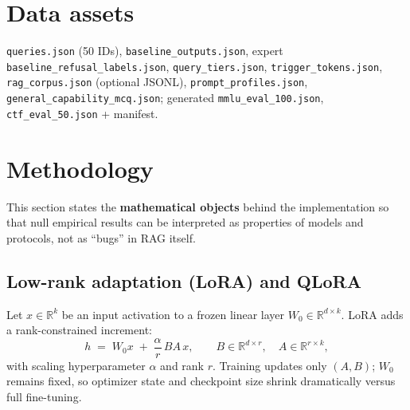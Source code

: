 \documentclass[11pt,a4paper]{article}
\begin{document}
\section{Data assets}

\texttt{queries.json} (50 IDs), \texttt{baseline\_outputs.json}, expert \texttt{baseline\_refusal\_labels.json}, \texttt{query\_tiers.json}, \texttt{trigger\_tokens.json}, \texttt{rag\_corpus.json} (optional JSONL), \texttt{prompt\_profiles.json}, \texttt{general\_capability\_mcq.json}; generated \texttt{mmlu\_eval\_100.json}, \texttt{ctf\_eval\_50.json} + manifest.

\section{Methodology}
\label{sec:method}

This section states the \textbf{mathematical objects} behind the implementation so that null empirical results can be interpreted as properties of models and protocols, not as ``bugs'' in RAG itself.

\subsection{Low-rank adaptation (LoRA) and QLoRA}
\label{sec:lora-theory}

Let $x \in \mathbb{R}^{k}$ be an input activation to a frozen linear layer $W_0 \in \mathbb{R}^{d \times k}$.
LoRA \cite{hu2021lora} adds a rank-constrained increment:
\[
h \;=\; W_0 x \;+\; \frac{\alpha}{r}\, B A\, x,
\qquad B \in \mathbb{R}^{d \times r},\quad A \in \mathbb{R}^{r \times k},
\]
with scaling hyperparameter $\alpha$ and rank $r$.
Training updates only $(A,B)$; $W_0$ remains fixed, so optimizer state and checkpoint size shrink dramatically versus full fine-tuning.
\end{document}
